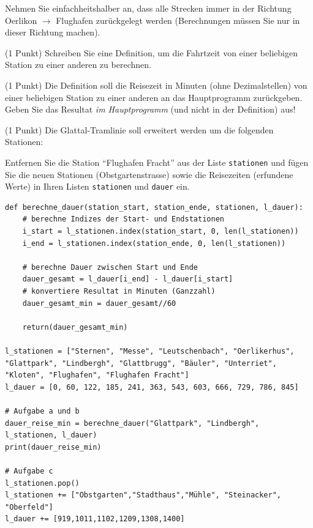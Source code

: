 \begin{questions}
Nehmen Sie einfachheitshalber an, dass alle Strecken immer in der Richtung Oerlikon $\rightarrow$ Flughafen zurückgelegt werden (Berechnungen müssen Sie nur in dieser Richtung machen).

(1 Punkt) Schreiben Sie eine Definition, um die Fahrtzeit von einer beliebigen Station zu einer anderen zu berechnen.

(1 Punkt) Die Definition soll die Reisezeit in Minuten (ohne Dezimalstellen) von einer beliebigen Station zu einer anderen an das Hauptprogramm zurückgeben. Geben Sie das Resultat \textit{im Hauptprogramm} (und nicht in der Definition) aus!

(1 Punkt) Die Glattal-Tramlinie soll erweitert werden um die folgenden Stationen:
\begin{figure}[H]
\centering

\end{figure}

Entfernen Sie die Station \enquote{Flughafen Fracht} aus der Liste \lstinline|stationen| und fügen Sie die neuen Stationen (Obstgartenstrasse) sowie die Reisezeiten (erfundene Werte) in Ihren Listen \lstinline|stationen| und \lstinline|dauer| ein.




\begin{solution}
\begin{lstlisting}
def berechne_dauer(station_start, station_ende, stationen, l_dauer):
    # berechne Indizes der Start- und Endstationen
    i_start = l_stationen.index(station_start, 0, len(l_stationen))
    i_end = l_stationen.index(station_ende, 0, len(l_stationen))

    # berechne Dauer zwischen Start und Ende
    dauer_gesamt = l_dauer[i_end] - l_dauer[i_start]
    # konvertiere Resultat in Minuten (Ganzzahl)
    dauer_gesamt_min = dauer_gesamt//60

    return(dauer_gesamt_min)

l_stationen = ["Sternen", "Messe", "Leutschenbach", "Oerlikerhus", "Glattpark", "Lindbergh", "Glattbrugg", "Bäuler", "Unterriet", "Kloten", "Flughafen", "Flughafen Fracht"]
l_dauer = [0, 60, 122, 185, 241, 363, 543, 603, 666, 729, 786, 845]

# Aufgabe a und b
dauer_reise_min = berechne_dauer("Glattpark", "Lindbergh", l_stationen, l_dauer)
print(dauer_reise_min)

# Aufgabe c
l_stationen.pop()
l_stationen += ["Obstgarten","Stadthaus","Mühle", "Steinacker", "Oberfeld"]
l_dauer += [919,1011,1102,1209,1308,1400]
\end{lstlisting}
\end{solution}


\end{questions}
